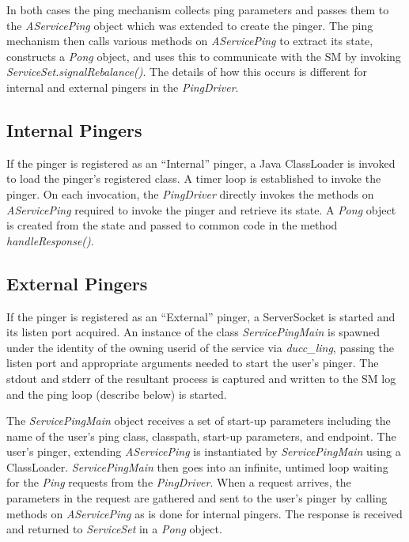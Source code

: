     In both cases the ping mechanism collects ping parameters and passes them to the {\em AServicePing}
    object which was extended to create the pinger.  The ping mechanism then calls various
    methods on {\em AServicePing} to extract its state, constructs a {\em Pong} object, and uses
    this to communicate with the SM by invoking {\em ServiceSet.signalRebalance()}.  The details
    of how this occurs is different for internal and external pingers in the {\em PingDriver}.
    
    \subsection{Internal Pingers}

    If the pinger is registered as an ``Internal'' pinger, a Java ClassLoader is invoked to load
    the pinger's registered class. A timer loop is established to invoke the pinger.  On
    each invocation, the {\em PingDriver} directly invokes the methods on {\em AServicePing} 
    required to invoke the pinger and retrieve its state.  A {\em Pong} object is created
    from the state and passed to common code in the method {\em handleResponse()}.

    \subsection{External Pingers}

    If the pinger is registered as an ``External'' pinger, a ServerSocket is started and its listen
    port acquired. An instance of the class {\em ServicePingMain} is spawned under the identity of
    the owning userid of the service via {\em ducc\_ling}, passing the listen port and appropriate
    arguments needed to start the user's pinger. The stdout and stderr of the resultant process is
    captured and written to the SM log and the ping loop (describe below) is started.
    
    The {\em ServicePingMain} object receives a set of start-up parameters including the
    name of the user's ping class, classpath, start-up parameters, and endpoint.  The user's
    pinger, extending {\em AServicePing} is instantiated by {\em ServicePingMain} using a
    ClassLoader.  {\em ServicePingMain} then goes into
    an infinite, untimed loop waiting for the {\em Ping} requests from the {\em PingDriver}.  When
    a request arrives, the parameters in the request are gathered and sent to the user's pinger
    by calling methods on {\em AServicePing} as is done for internal pingers.
    The response is received and returned to {\em ServiceSet} in a {\em Pong} object.
    
